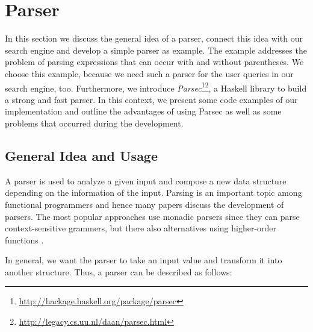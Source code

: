 \documentclass[%
	pdftex,%
	a4paper,%
	oneside,%
	chapterprefix,%
	headsepline,%
	12pt%
]{scrbook}
\newcommand{\Conid}[1]{\mathit{#1}}
\def\resethooks{%
  \global\let\SaveRestoreHook\empty
  \global\let\ColumnHook\empty}
\let\hspre\empty
\let\hspost\empty
\begin{document}


 
\section{Parser}\label{implementation:parser}

In this section we discuss the general idea of a parser, connect this
idea with our search engine and develop a simple parser as example. %
The example addresses the problem of parsing expressions that can
occur with and without parentheses. %
We choose this example, because we need such a parser for the user
queries in our search engine, too. %
Furthermore, we introduce
\emph{Parsec}\footnote{\url{http://hackage.haskell.org/package/parsec}}\footnote{\url{http://legacy.cs.uu.nl/daan/parsec.html}},
a Haskell library to build a strong and fast parser. %
In this context, we present some code examples of our implementation
and outline the advantages of using Parsec as well as some
problems that occurred during the development. %

\subsection{General Idea and Usage}

A parser is used to analyze a given input and compose a new data
structure depending on the information of the input. %
Parsing is an important topic among functional programmers and hence
many papers discuss the development of parsers. %
The most popular approaches use monadic parsers \cite{monpars} since
they can parse context-sensitive grammers, but there also alternatives
using higher-order functions \cite{funcpar}. %

In general, we want the parser to take an input value and transform it
into another structure. Thus, a parser can be described as
follows:

\begin{hscode}\SaveRestoreHook
\column{B}{@{}>{\hspre}l<{\hspost}@{}}%
\column{E}{@{}>{\hspre}l<{\hspost}@{}}%
\>[B]{}\;\Conid{Parser}\;\sigma \;\alpha \mathrel{=}\sigma \to \alpha {}\<[E]%
\ColumnHook
\end{hscode}\resethooks
\end{document}
